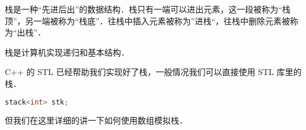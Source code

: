 
栈是一种“先进后出”的数据结构．栈只有一端可以进出元素，这一段被称为“栈顶”，另一端被称为“栈底”．往栈中插入元素被称为”进栈“，往栈中删除元素被称为“出栈”．

栈是计算机实现递归和基本结构．

C++ 的 STL 已经帮助我们实现好了栈，一般情况我们可以直接使用 STL 库里的栈．

\begin{lstlisting}[language=cpp]
stack<int> stk;

\end{lstlisting}

但我们在这里详细的讲一下如何使用数组模拟栈．